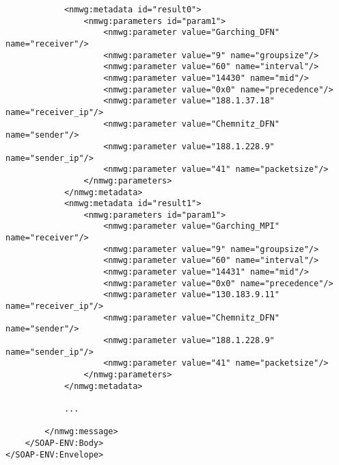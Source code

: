 \documentclass[a4paper,12pt,titlepage,hidelinks,fleqn]{article}
\begin{document}
\begin{flushleft}
\begin{framed}
\begin{lstlisting}
			<nmwg:metadata id="result0">
				<nmwg:parameters id="param1">
					<nmwg:parameter value="Garching_DFN" name="receiver"/>
					<nmwg:parameter value="9" name="groupsize"/>
					<nmwg:parameter value="60" name="interval"/>
					<nmwg:parameter value="14430" name="mid"/>
					<nmwg:parameter value="0x0" name="precedence"/>
					<nmwg:parameter value="188.1.37.18" name="receiver_ip"/>
					<nmwg:parameter value="Chemnitz_DFN" name="sender"/>
					<nmwg:parameter value="188.1.228.9" name="sender_ip"/>
					<nmwg:parameter value="41" name="packetsize"/>
				</nmwg:parameters>
			</nmwg:metadata>
			<nmwg:metadata id="result1">
				<nmwg:parameters id="param1">
					<nmwg:parameter value="Garching_MPI" name="receiver"/>
					<nmwg:parameter value="9" name="groupsize"/>
					<nmwg:parameter value="60" name="interval"/>
					<nmwg:parameter value="14431" name="mid"/>
					<nmwg:parameter value="0x0" name="precedence"/>
					<nmwg:parameter value="130.183.9.11" name="receiver_ip"/>
					<nmwg:parameter value="Chemnitz_DFN" name="sender"/>
					<nmwg:parameter value="188.1.228.9" name="sender_ip"/>
					<nmwg:parameter value="41" name="packetsize"/>
				</nmwg:parameters>
			</nmwg:metadata>
			
			...
								  
		</nmwg:message>
	</SOAP-ENV:Body>
</SOAP-ENV:Envelope>
\end{lstlisting}
\end{framed}
\end{flushleft}
\end{document}
